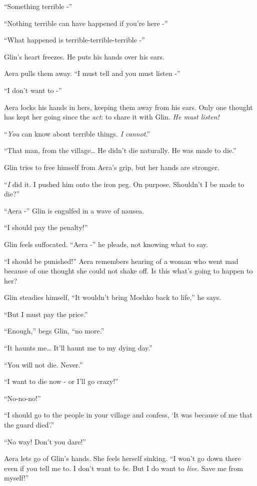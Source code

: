 \documentclass[twoside,11pt]{book}
\begin{document}
``Something terrible -''

``Nothing terrible can have happened if you're here -''

``What happened is terrible-terrible-terrible -''

Glin's heart freezes. He puts his hands over his ears.

Aera pulls them away. ``I must tell and you must listen -''

``I don't want to -''

Aera locks his hands in hers, keeping them away from his ears. Only one thought has kept her going since the
\textit{act}: to share it with Glin. \textit{He must listen! }

``\textit{You} can know about terrible things. \textit{I cannot}.''

``That man, from the village{\dots} He didn't die naturally. He was made to die.''

Glin tries to free himself from Aera's grip, but her hands are stronger.

``\textit{I} did it. I pushed him onto the iron peg. On purpose. Shouldn't I be made to die?''


``Aera -'' Glin is engulfed in a wave of nausea.

``I should pay the penalty!''

Glin feels suffocated. ``Aera -'' he pleads, not knowing what to say.

``I should be punished!'' Aera remembers hearing of a woman who went mad because of one
thought she could not shake off. Is this what's going to happen to her?

Glin steadies himself, ``It wouldn't bring Moshko back to life,'' he says.

``But I must pay the price.''

``Enough,'' begs Glin, ``no more.''

``It haunts me{\dots} It'll haunt me to my dying day.''

``You will not die. Never.''

``I want to die now - or I'll go crazy!''

``No-no-no!''

``I should go to the people in your village and confess, `It was because of me that the guard
died'.''

``No way! Don't you dare!''

Aera lets go of Glin's hands. She feels herself sinking. ``I won't go down there even if you tell me to. I
don't want to \textit{be}. But I do want to \textit{live}. Save me from myself!''
\end{document}

